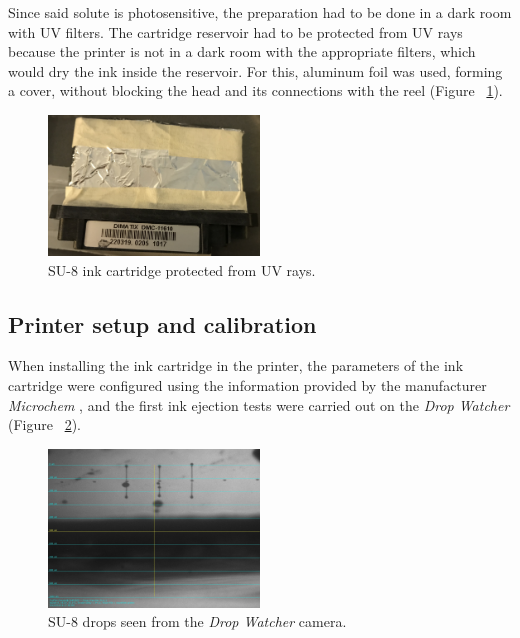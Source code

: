 Since said solute is photosensitive, the preparation had to be done in a dark room with UV filters. The cartridge reservoir had to be protected from UV rays because the printer is not in a dark room with the appropriate filters, which would dry the ink inside the reservoir. For this, aluminum foil was used, forming a cover, without blocking the head and its connections with the reel (Figure ~\ref{fig:Figura_cartucho_SU8}).

\begin{figure}[H]
  \centering
    \includegraphics[width=0.5\textwidth]{Figures/Figura_cartucho_SU8}
  \caption{SU-8 ink cartridge protected from UV rays.}
  \label{fig:Figura_cartucho_SU8}
\end{figure}

\subsection{Printer setup and calibration}
When installing the ink cartridge in the printer, the parameters of the ink cartridge were configured using the information provided by the manufacturer \textit{Microchem} \cite{PriElexSU8}, and the first ink ejection tests were carried out on the \textit{Drop Watcher} (Figure ~\ref{fig:Figura_Drop_Watcher_SU8}).

\begin{figure}[H]
  \centering
    \includegraphics[width=0.5\textwidth]{Figures/Figura_Drop_Watcher_SU8}
  \caption{SU-8 drops seen from the \textit{Drop Watcher} camera.}
  \label{fig:Figura_Drop_Watcher_SU8}
\end{figure}

